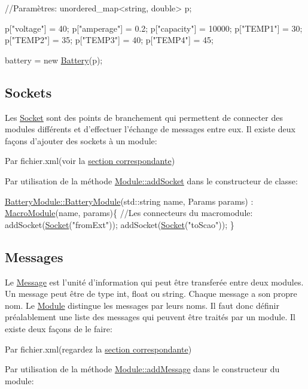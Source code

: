 \begin{DoxyCode}
\textcolor{comment}{//Paramètres:}
unordered\_map<string, double> p;

p[\textcolor{stringliteral}{"voltage"}] = 40;
p[\textcolor{stringliteral}{"amperage"}] = 0.2;
p[\textcolor{stringliteral}{"capacity"}] = 10000;
p[\textcolor{stringliteral}{"TEMP1"}] = 30;
p[\textcolor{stringliteral}{"TEMP2"}] = 35;
p[\textcolor{stringliteral}{"TEMP3"}] = 40;
p[\textcolor{stringliteral}{"TEMP4"}] = 45;

battery = \textcolor{keyword}{new} \hyperlink{classBattery}{Battery}(p);
\end{DoxyCode}
\hypertarget{docModule_sockets}{}\subsection{Sockets}\label{docModule_sockets}
Les \hyperlink{classSocket}{Socket} sont des points de branchement qui permettent de connecter des modules différents et d'effectuer l'échange de messages entre eux. Il existe deux façons d'ajouter des sockets à un module\-:
\begin{DoxyItemize}
\item Par fichier.\-xml(voir la \hyperlink{xmlRef}{section correspondante})
\item Par utilisation de la méthode \hyperlink{classModule_aeb7302c667eb923a4dc25ae235c744dc}{Module\-::add\-Socket} dans le constructeur de classe\-: 
\begin{DoxyCode}
\hyperlink{classBatteryModule_a2fb494ef5f124c38c0fdf9ccfb31918f}{BatteryModule::BatteryModule}(std::string name, 
      Params params) : \hyperlink{classMacroModule}{MacroModule}(name, params)\{
    \textcolor{comment}{//Les connecteurs du macromodule:}
    addSocket(\hyperlink{classSocket}{Socket}(\textcolor{stringliteral}{"fromExt"}));
    addSocket(\hyperlink{classSocket}{Socket}(\textcolor{stringliteral}{"toScao"}));
\}
\end{DoxyCode}

\end{DoxyItemize}\hypertarget{docModule_messages}{}\subsection{Messages}\label{docModule_messages}
Le \hyperlink{classMessage}{Message} est l'unité d'information qui peut être transferée entre deux modules. Un message peut être de type int, float ou string. Chaque message a son propre nom. Le \hyperlink{classModule}{Module} distingue les messages par leurs noms. Il faut donc définir préalablement une liste des messages qui peuvent être traités par un module. Il existe deux façons de le faire\-:
\begin{DoxyItemize}
\item Par fichier.\-xml(regardez la \hyperlink{xmlRef}{section correspondante})
\item Par utilisation de la méthode \hyperlink{classModule_a146f454fded03cda14359e419086afa5}{Module\-::add\-Message} dans le constructeur du module\-:
\end{DoxyItemize}


